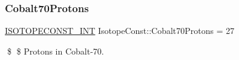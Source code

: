 \subsubsection{\texorpdfstring{Cobalt70\+Protons}{Cobalt70Protons}}
{\footnotesize\ttfamily \mbox{\hyperlink{group___isotope_const-_macros_ga5f18360b3e99483a35c32d789e62621c}{I\+S\+O\+T\+O\+P\+E\+C\+O\+N\+S\+T\+\_\+\+I\+NT}} Isotope\+Const\+::\+Cobalt70\+Protons = 27}

\$ \$ Protons in Cobalt-\/70. 